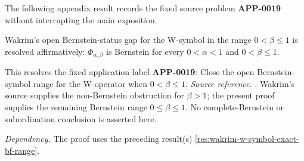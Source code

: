 The following appendix result records the fixed source problem \textbf{APP-0019} \cite{wakrim-w} without interrupting the main exposition.
\begin{corollary}
\label{res:wakrim-w-operator-bf-gap-solved}
Wakrim's open Bernstein-status gap for the W-symbol in the range \(0<\beta\le1\) is resolved affirmatively: \(\Phi_{\alpha,\beta}\) is Bernstein for every \(0<\alpha<1\) and \(0<\beta\le1\).

This resolves the fixed application label \textbf{APP-0019}: Close the open Bernstein-symbol range for the W-operator when \(0<\beta\le1\).
\emph{Source reference.} \cite{wakrim-w}.
Wakrim's source \cite{wakrim-w} supplies the non-Bernstein obstruction for \(\beta>1\); the present proof supplies the remaining Bernstein range \(0\le\beta\le1\). No complete-Bernstein or subordination conclusion is asserted here.

\emph{Dependency.} The proof uses the preceding result(s) \ref{res:wakrim-w-symbol-exact-bf-range}.
\end{corollary}
